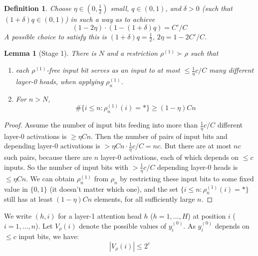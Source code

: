 \documentclass[11pt,letterpaper]{article}
\newcounter{theorem}
\newtheorem{defin}[theorem]{Definition}
\newtheorem{lemma}[theorem]{Lemma}
\begin{document}
\begin{defin}\label{def:constants}
Choose $\eta \in (0,\frac{1}{2})$ small, $q \in (0,1)$, and $\delta >0$ (such that $(1+\delta)q \in (0,1)$) in such a way as to achieve
\begin{equation}
    (1-2\eta)\cdot (1-(1+\delta)q) = C'/C
\end{equation}
A possible choice to satisfy this is $(1+\delta)q = \frac{1}{2}$, $2\eta = 1-2C'/C$.
\end{defin}


\begin{lemma}[Stage 1]\label{lemma:stage1}
There is $N$ and a restriction $\rho^{(1)} \succ \rho$ such that 
\begin{enumerate}
    \item each $\rho^{(1)}$-free input bit serves as an input to at most $\leq \frac{1}{\eta} c/C$ many different layer-0 heads, when applying $\rho^{(1)}_n$.
    \item For $n > N$, 
    \begin{equation}
        \#\{i \leq n: \rho^{(1)}_n(i) = *\} \geq (1-\eta) C n
    \end{equation}
\end{enumerate}
\end{lemma}
\begin{proof}
Assume the number of input bits feeding into more than $\frac{1}{\eta} c/C$ different layer-0 activations is $\geq \eta Cn$.
Then the number of pairs of input bits and depending layer-0 activations is $>\eta Cn \cdot \frac{1}{\eta} c/C = nc$.
But there are at most $nc$ such pairs, because there are $n$ layer-0 activations, each of which depends on $\leq c$ inputs.
So the number of input bits with $> \frac{1}{\eta} c/C$ depending layer-0 heads is $\leq \eta Cn$.
We can obtain $\rho^{(1)}_n$ from $\rho_n$ by restricting these input bits to some fixed value in $\{0, 1\}$ (it doesn't matter which one), and the set $\{i \leq n: \rho^{(1)}_n(i) = *\}$ still has at least $(1-\eta) C n$ elements, for all sufficiently large $n$.
\end{proof}


We write $(h,i)$ for a layer-1 attention head $h$ ($h=1,\dots, H$) at position $i$ ($i=1, \dots, n$).
Let $V_\rho(i)$ denote the possible values of $y^{(0)}_i$.
As $y^{(0)}_i$ depends on $\leq c$ input bits, we have:
\begin{equation}
|V_\rho(i)| \leq 2^c
\end{equation}
\end{document}
